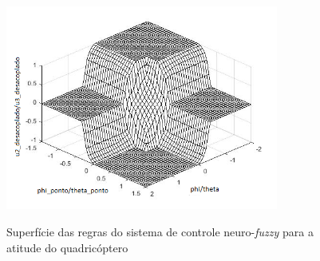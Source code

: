 \begin{figure}[!htb]
    \centering
    \caption{Superfície das regras do sistema de controle neuro-\textit{fuzzy} para a atitude do quadricóptero}
    \includegraphics[width=0.8\textwidth]{./04-figuras/figuras_pos_banca/9-refinando-grids/editados/grid_anfis_atitude}
    \label{fig:grid_anfis_atitude}
\end{figure}

